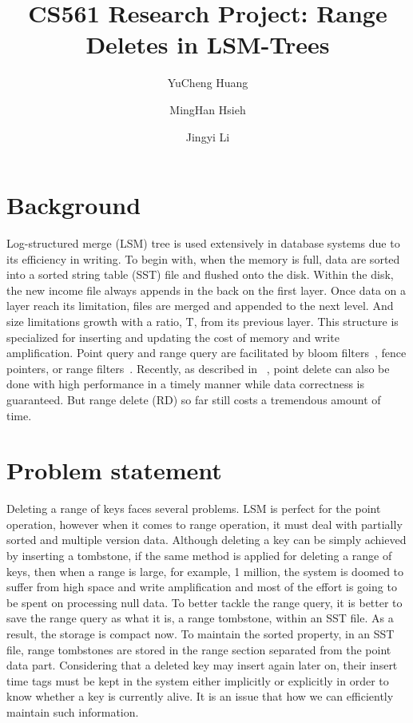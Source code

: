\documentclass[sigconf]{acmart}
\begin{document}
\title{CS561 Research Project: Range Deletes in LSM-Trees}

\author{YuCheng Huang}
\author{MingHan Hsieh}
\author{Jingyi Li}
\maketitle

\section{Background}
    Log-structured merge (LSM) tree is used extensively in database systems due to its efficiency in writing. To begin with, when the memory is full, data are sorted into a sorted string table (SST) file and flushed onto the disk. Within the disk, the new income file always appends in the back on the first layer. Once data on a layer reach its limitation, files are merged and appended to the next level. And size limitations growth with a ratio, T, from its previous layer. This structure is specialized for inserting and updating the cost of memory and write amplification. Point query and range query are facilitated by bloom filters~\cite{BF_reducing_CPU_overload}, fence pointers, or range filters~\cite{rangeFilter}. Recently, as described in ~\cite{Lethe}, point delete can also be done with high performance in a timely manner while data correctness is guaranteed. But range delete (RD) so far still costs a tremendous amount of time.
\section{Problem statement}
    Deleting a range of keys faces several problems. LSM is perfect for the point operation, however when it comes to range operation, it must deal with partially sorted and multiple version data. Although deleting a key can be simply achieved by inserting a tombstone, if the same method is applied for deleting a range of keys, then when a range is large, for example, 1 million, the system is doomed to suffer from high space and write amplification and most of the effort is going to be spent on processing null data. To better tackle the range query, it is better to save the range query as what it is, a range tombstone, within an SST file. As a result, the storage is compact now. To maintain the sorted property, in an SST file, range tombstones are stored in the range section separated from the point data part. Considering that a deleted key may insert again later on, their insert time tags must be kept in the system either implicitly or explicitly in order to know whether a key is currently alive. It is an issue that how we can efficiently maintain such information.
\end{document}
